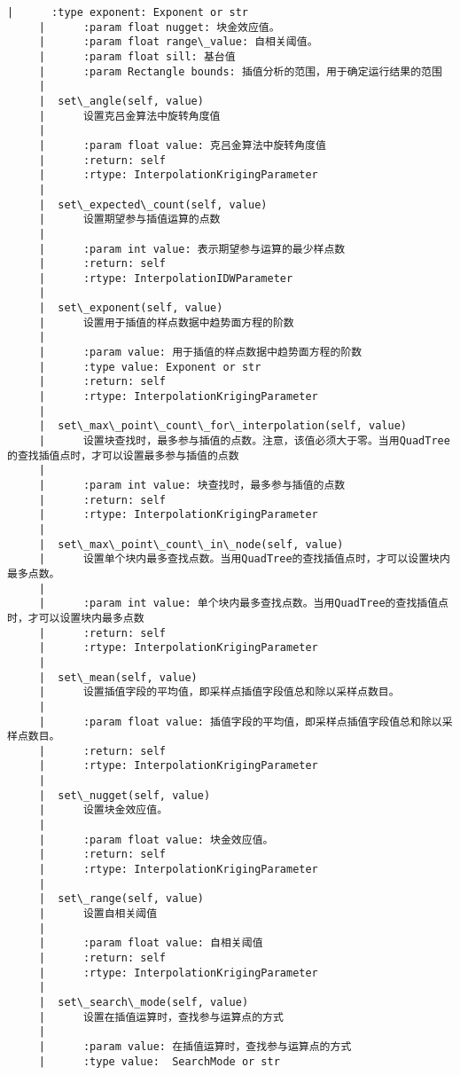 \documentclass[11pt]{article}
\begin{document}
\begin{Verbatim}[commandchars=\\\{\}]
     |      :type exponent: Exponent or str
     |      :param float nugget: 块金效应值。
     |      :param float range\_value: 自相关阈值。
     |      :param float sill: 基台值
     |      :param Rectangle bounds: 插值分析的范围，用于确定运行结果的范围
     |  
     |  set\_angle(self, value)
     |      设置克吕金算法中旋转角度值
     |      
     |      :param float value: 克吕金算法中旋转角度值
     |      :return: self
     |      :rtype: InterpolationKrigingParameter
     |  
     |  set\_expected\_count(self, value)
     |      设置期望参与插值运算的点数
     |      
     |      :param int value: 表示期望参与运算的最少样点数
     |      :return: self
     |      :rtype: InterpolationIDWParameter
     |  
     |  set\_exponent(self, value)
     |      设置用于插值的样点数据中趋势面方程的阶数
     |      
     |      :param value: 用于插值的样点数据中趋势面方程的阶数
     |      :type value: Exponent or str
     |      :return: self
     |      :rtype: InterpolationKrigingParameter
     |  
     |  set\_max\_point\_count\_for\_interpolation(self, value)
     |      设置块查找时，最多参与插值的点数。注意，该值必须大于零。当用QuadTree的查找插值点时，才可以设置最多参与插值的点数
     |      
     |      :param int value: 块查找时，最多参与插值的点数
     |      :return: self
     |      :rtype: InterpolationKrigingParameter
     |  
     |  set\_max\_point\_count\_in\_node(self, value)
     |      设置单个块内最多查找点数。当用QuadTree的查找插值点时，才可以设置块内最多点数。
     |      
     |      :param int value: 单个块内最多查找点数。当用QuadTree的查找插值点时，才可以设置块内最多点数
     |      :return: self
     |      :rtype: InterpolationKrigingParameter
     |  
     |  set\_mean(self, value)
     |      设置插值字段的平均值，即采样点插值字段值总和除以采样点数目。
     |      
     |      :param float value: 插值字段的平均值，即采样点插值字段值总和除以采样点数目。
     |      :return: self
     |      :rtype: InterpolationKrigingParameter
     |  
     |  set\_nugget(self, value)
     |      设置块金效应值。
     |      
     |      :param float value: 块金效应值。
     |      :return: self
     |      :rtype: InterpolationKrigingParameter
     |  
     |  set\_range(self, value)
     |      设置自相关阈值
     |      
     |      :param float value: 自相关阈值
     |      :return: self
     |      :rtype: InterpolationKrigingParameter
     |  
     |  set\_search\_mode(self, value)
     |      设置在插值运算时，查找参与运算点的方式
     |      
     |      :param value: 在插值运算时，查找参与运算点的方式
     |      :type value:  SearchMode or str

\end{Verbatim}
\end{document}

